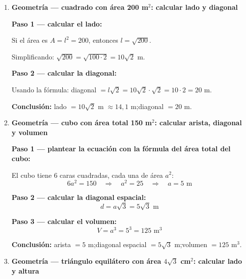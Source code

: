 \documentclass[11pt, letterpaper]{article}
\begin{document}
\begin{tcolorbox}[examplebox, title={Ejemplos resueltos}]
\begin{enumerate}[label=\textbf{Ej. \arabic*.}, leftmargin=*, itemsep=18pt]
\textbf{Paso 1 — aislar una raíz (la más sencilla):}
$$\sqrt{x+3} = 5 - \sqrt{x-2}$$

\textbf{Paso 2 — elevar al cuadrado ambos lados:}
$$x+3 = 25 - 10\sqrt{x-2} + (x-2)$$

\textbf{Paso 3 — simplificar e aislar la raíz restante:}
$$x+3 = x+23 - 10\sqrt{x-2}$$
$$10\sqrt{x-2} = 20$$
$$\sqrt{x-2} = 2$$

\textbf{Paso 4 — resolver:}
$$x-2 = 4 \quad\Longrightarrow\quad x = 6$$

\textbf{Paso 5 — verificar:}
$$\sqrt{6+3}+\sqrt{6-2} = \sqrt{9}+\sqrt{4} = 3+2 = 5 \quad\checkmark$$

\textbf{Conclusión:} $x = 6$.

\item \textbf{Geometría — cuadrado con área 200 m$^2$: calcular lado y diagonal}

\textbf{Paso 1 — calcular el lado:}

Si el área es $A = l^2 = 200$, entonces $l = \sqrt{200}$.

Simplificando: $\sqrt{200} = \sqrt{100 \cdot 2} = 10\sqrt{2}$ m.

\textbf{Paso 2 — calcular la diagonal:}

Usando la fórmula: diagonal $= l\sqrt{2} = 10\sqrt{2} \cdot \sqrt{2} = 10 \cdot 2 = 20$ m.

\textbf{Conclusión:} lado $= 10\sqrt{2}$ m $\approx 14{,}1$ m;\quad diagonal $= 20$ m.

\item \textbf{Geometría — cubo con área total 150 m$^2$: calcular arista, diagonal y volumen}

\textbf{Paso 1 — plantear la ecuación con la fórmula del área total del cubo:}

El cubo tiene 6 caras cuadradas, cada una de área $a^2$:
$$6a^2 = 150 \quad\Longrightarrow\quad a^2 = 25 \quad\Longrightarrow\quad a = 5 \text{ m}$$

\textbf{Paso 2 — calcular la diagonal espacial:}
$$d = a\sqrt{3} = 5\sqrt{3} \text{ m}$$

\textbf{Paso 3 — calcular el volumen:}
$$V = a^3 = 5^3 = 125 \text{ m}^3$$

\textbf{Conclusión:} arista $= 5$ m;\quad diagonal espacial $= 5\sqrt{3}$ m;\quad volumen $= 125$ m$^3$.

\item \textbf{Geometría — triángulo equilátero con área $4\sqrt{3}$ cm$^2$: calcular lado y altura}


\end{enumerate}
\end{tcolorbox}
\end{document}
